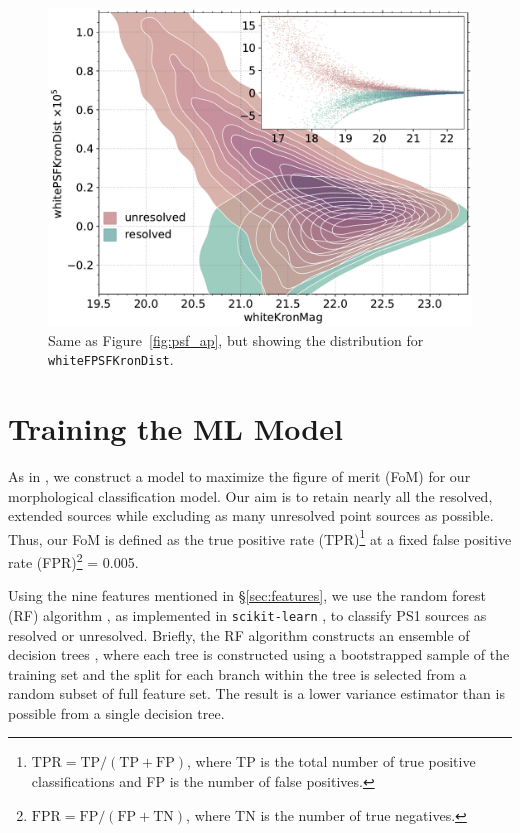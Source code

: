 \documentclass[twocolumn]{aastex63}
\begin{document}
\begin{figure}
    \centering
    \includegraphics[width=\columnwidth]{./figures/whiteFPSFKronDist.pdf}
    \caption{Same as Figure~\ref{fig:psf_ap}, but showing the distribution for
    \texttt{whiteFPSFKronDist}.}
    \label{fig:psf_kron}
\end{figure}  

\section{Training the ML Model}

As in \citet{Tachibana18}, we construct a model to maximize the figure of
merit (FoM) for our morphological classification model. Our aim is to retain
nearly all the resolved, extended sources while excluding as many unresolved
point sources as possible. Thus, our FoM is defined as the true positive rate
(TPR)\footnote{$\mathrm{TPR} = \mathrm{TP}/(\mathrm{TP} + \mathrm{FP})$, where
TP is the total number of true positive classifications and FP is the number
of false positives.} at a fixed false positive rate
(FPR)\footnote{$\mathrm{FPR} = \mathrm{FP}/(\mathrm{FP}+\mathrm{TN})$, where
TN is the number of true negatives.} = 0.005.

Using the nine features mentioned in \S\ref{sec:features}, we use the random
forest (RF) algorithm \citep{Breiman01}, as implemented in
\texttt{scikit-learn} \citep{Pedregosa11}, to classify PS1 sources as resolved
or unresolved. Briefly, the RF algorithm constructs an ensemble of decision
trees \citep{Breiman84}, where each tree is constructed using a bootstrapped
sample of the training set \citep[a method known as ``bagging'';][]{Breiman96}
and the split for each branch within the tree is selected from a random subset
of full feature set. The result is a lower variance estimator than is possible
from a single decision tree.
\end{document}
